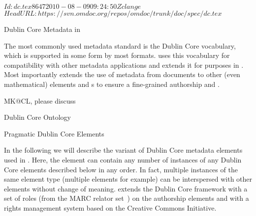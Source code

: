 \svnInfo $Id: dc.tex 8647 2010-08-09 09:24:50Z clange $
\svnKeyword $HeadURL: https://svn.omdoc.org/repos/omdoc/trunk/doc/spec/dc.tex $

\begin{module}[id=dc-elements]
  \begin{omgroup}[id=dc-elements]{Dublin Core Metadata in {\omdoc}}

The most commonly used metadata standard is the Dublin Core vocabulary, which is
supported in some form by most formats. {\omdoc} uses this vocabulary for compatibility
with other metadata applications and extends it for {}
purposes in {\omdoc}.  Most importantly {\omdoc} extends the use of metadata from
documents to other (even mathematical) elements and {s} to
ensure a fine-grained authorship and {}.


\begin{newpart}{MK@CL, please discuss}
\begin{omgroup}{Dublin Core Ontology}

\end{omgroup}

\begin{omgroup}{Pragmatic Dublin Core Elements}

In the following we will describe the variant of Dublin Core metadata elements used in
{\omdoc}.  Here, the {} element can contain any number of instances of
any Dublin Core elements described below in any order. In fact, multiple instances of the
same element type (multiple {} elements for example) can be
interspersed with other elements without change of meaning.  {\omdoc} extends the Dublin
Core framework with a set of roles (from the MARC relator set~\cite{Marc:relators03}) on
the authorship elements and with a rights management system based on the Creative Commons
Initiative.



\end{omgroup}
\end{newpart}
\end{omgroup}
\end{module}
